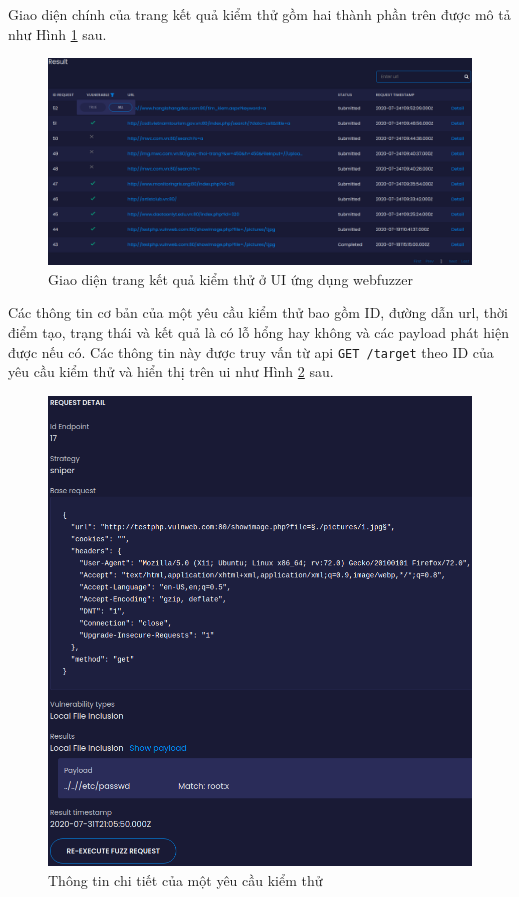 Giao diện chính của trang kết quả kiểm thử gồm hai thành phần trên được mô tả như Hình \ref{fig:result-ui-ui} sau.
\FloatBarrier
\begin{figure}
    \centering
        \includegraphics[scale=0.44,keepaspectratio=true]{images/result-ui.png}
    \caption{Giao diện trang kết quả kiểm thử ở UI ứng dụng webfuzzer}
    \label{fig:result-ui-ui}
\end{figure}
\FloatBarrier
Các thông tin cơ bản của một yêu cầu kiểm thử bao gồm ID, đường dẫn \acrshort{url}, thời điểm tạo, trạng thái và kết quả là có lỗ hổng hay không và các payload phát hiện được nếu có. Các thông tin này được truy vấn từ \acrshort{api} \colorbox{gray!30}{\texttt{GET /target}} theo ID của yêu cầu kiểm thử và hiển thị trên \acrshort{ui} như Hình \ref{fig:request-detail} sau.
\begin{figure}[H]
  \centering
    \includegraphics[width=1\textwidth,keepaspectratio=true]{images/request-detail.png}
  \caption{Thông tin chi tiết của một yêu cầu kiểm thử}
  \label{fig:request-detail}
\end{figure}
